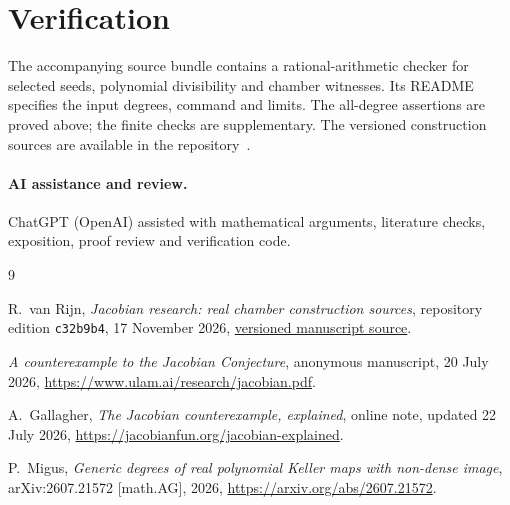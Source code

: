 \documentclass[11pt]{article}
\numberwithin{equation}{section}
\begin{document}
\section*{Verification}

The accompanying source bundle contains a rational-arithmetic checker for
selected seeds, polynomial divisibility and chamber witnesses.  Its README
specifies the input degrees, command and limits.  The all-degree assertions
are proved above; the finite checks are supplementary.  The versioned
construction sources are available in the repository~\cite{Sources}.

\paragraph{AI assistance and review.}
ChatGPT (OpenAI) assisted with mathematical arguments, literature checks,
exposition, proof review and verification code.

\begin{thebibliography}{9}

R.~van Rijn, \emph{Jacobian research: real chamber construction sources},
repository edition \texttt{c32b9b4}, 17 November 2026,
\href{https://github.com/royvanrijn/jacobian-research/tree/c32b9b4d273cf7988e85184a0d5eae9c488727fd/unpublished/exact-real-chamber-spectra}{versioned manuscript source}.

\emph{A counterexample to the Jacobian Conjecture},
anonymous manuscript, 20 July 2026,
\url{https://www.ulam.ai/research/jacobian.pdf}.

A.~Gallagher,
\emph{The Jacobian counterexample, explained},
online note, updated 22 July 2026,
\url{https://jacobianfun.org/jacobian-explained}.

P.~Migus,
\emph{Generic degrees of real polynomial Keller maps with non-dense image},
arXiv:2607.21572 [math.AG], 2026,
\url{https://arxiv.org/abs/2607.21572}.

\end{thebibliography}
\end{document}
